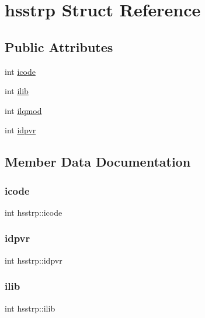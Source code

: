 \hypertarget{structhsstrp}{}\section{hsstrp Struct Reference}
\label{structhsstrp}
\subsection*{Public Attributes}
\begin{DoxyCompactItemize}
\item 
int \hyperlink{structhsstrp_a1568aa2c04eb5d02101b130bfb86e145}{icode}
\item 
int \hyperlink{structhsstrp_aebc15eb3c5e6d67d96fb71982fb9d006}{ilib}
\item 
int \hyperlink{structhsstrp_a55a031a78e620183149145fc74fdf934}{ilqmod}
\item 
int \hyperlink{structhsstrp_a76c0c1e738285eeaca6545e545971b27}{idpvr}
\end{DoxyCompactItemize}


\subsection{Member Data Documentation}
\mbox{\label{structhsstrp_a1568aa2c04eb5d02101b130bfb86e145}} 
\subsubsection{\texorpdfstring{icode}{icode}}
{\footnotesize\ttfamily int hsstrp\+::icode}

\mbox{\label{structhsstrp_a76c0c1e738285eeaca6545e545971b27}} 
\subsubsection{\texorpdfstring{idpvr}{idpvr}}
{\footnotesize\ttfamily int hsstrp\+::idpvr}

\mbox{\label{structhsstrp_aebc15eb3c5e6d67d96fb71982fb9d006}} 
\subsubsection{\texorpdfstring{ilib}{ilib}}
{\footnotesize\ttfamily int hsstrp\+::ilib}

